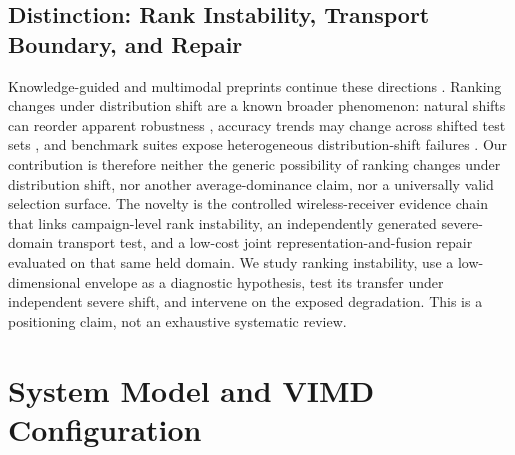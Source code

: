 \documentclass[letterpaper,journal]{IEEEtran}
\begin{document}
\subsection{Distinction: Rank Instability, Transport Boundary, and Repair}
Knowledge-guided and multimodal preprints continue these directions
\cite{dkdnet2026preprint,moeformer2026preprint,zoomspec2026preprint,
rismae2025preprint}. Ranking changes under distribution shift are a known
broader phenomenon: natural shifts can reorder apparent robustness
\cite{taori2020naturalshift}, accuracy trends may change across shifted test
sets \cite{miller2021accuracyline}, and benchmark suites expose heterogeneous
distribution-shift failures \cite{koh2021wilds}. Our contribution is therefore
neither the generic possibility of
ranking changes under distribution shift, nor another average-dominance claim,
nor a universally valid selection surface. The novelty is the controlled
wireless-receiver evidence chain that links campaign-level rank instability,
an independently generated severe-domain transport test, and a low-cost
joint representation-and-fusion repair evaluated on that same held domain. We study
ranking instability, use a low-dimensional envelope as a diagnostic
hypothesis, test its transfer under independent severe shift, and intervene on
the exposed degradation. This is a positioning claim, not an
exhaustive systematic review.

\section{System Model and VIMD Configuration}
\end{document}
